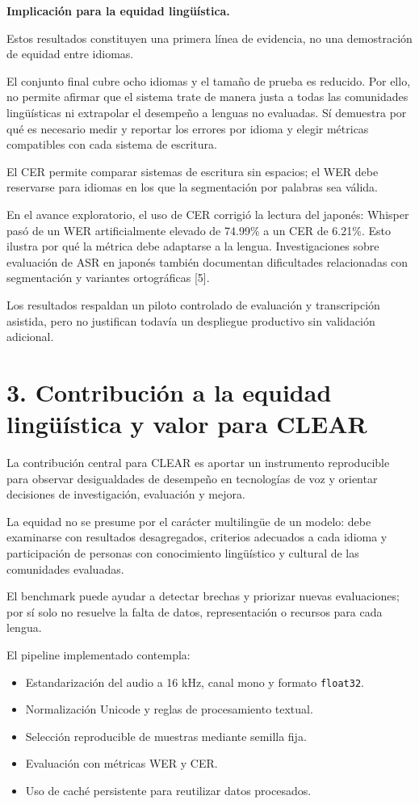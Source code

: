 \documentclass[letterpaper,11pt]{article}
\begin{document}
\textbf{Implicación para la equidad lingüística.}

Estos resultados constituyen una primera línea de evidencia,
no una demostración de equidad entre idiomas.

El conjunto final cubre ocho idiomas y el tamaño de prueba
es reducido. Por ello, no permite afirmar que el sistema
trate de manera justa a todas las comunidades lingüísticas
ni extrapolar el desempeño a lenguas no evaluadas. Sí demuestra 
por qué es necesario medir y reportar los
errores por idioma y elegir métricas compatibles con cada
sistema de escritura.

El CER permite comparar sistemas de escritura sin espacios;
el WER debe reservarse para idiomas en los que la
segmentación por palabras sea válida.

En el avance exploratorio, el uso de CER corrigió la lectura
del japonés: Whisper pasó de un WER artificialmente elevado
de 74.99\% a un CER de 6.21\%. Esto ilustra por qué la métrica
debe adaptarse a la lengua. Investigaciones sobre evaluación
de ASR en japonés también documentan dificultades relacionadas
con segmentación y variantes ortográficas [5].

Los resultados respaldan un piloto controlado de evaluación
y transcripción asistida, pero no justifican todavía un
despliegue productivo sin validación adicional.

\section*{\color{azul}3. Contribución a la equidad lingüística
y valor para CLEAR}

La contribución central para CLEAR es aportar un instrumento
reproducible para observar desigualdades de desempeño en
tecnologías de voz y orientar decisiones de investigación,
evaluación y mejora.

La equidad no se presume por el carácter multilingüe de un
modelo: debe examinarse con resultados desagregados,
criterios adecuados a cada idioma y participación de personas
con conocimiento lingüístico y cultural de las comunidades
evaluadas.

El benchmark puede ayudar a detectar brechas y priorizar
nuevas evaluaciones; por sí solo no resuelve la falta de datos,
representación o recursos para cada lengua.

El pipeline implementado contempla:

\begin{itemize}[leftmargin=*,itemsep=2pt]
    \item Estandarización del audio a 16 kHz, canal mono
    y formato \texttt{float32}.
    \item Normalización Unicode y reglas de procesamiento
    textual.
    \item Selección reproducible de muestras mediante
    semilla fija.
    \item Evaluación con métricas WER y CER.
    \item Uso de caché persistente para reutilizar datos
    procesados.
\end{itemize}
\end{document}
